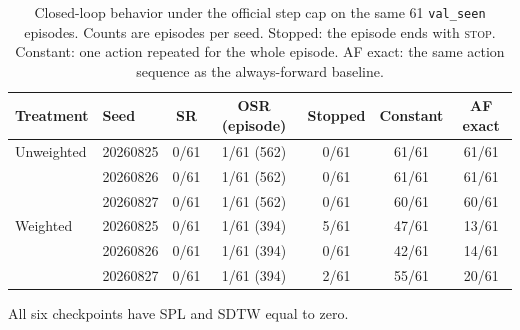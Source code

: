\begin{table}[t]
\centering
\small
\caption{Closed-loop behavior under the official step cap on the same 61 \texttt{val\_seen} episodes. Counts are episodes per seed. Stopped: the episode ends with \textsc{stop}. Constant: one action repeated for the whole episode. AF exact: the same action sequence as the always-forward baseline.}
\label{tab:closed-loop-behavior}
\begin{tabular}{llccccc}
\toprule
Treatment & Seed & SR & OSR (episode) & Stopped & Constant & AF exact \\
\midrule
Unweighted & 20260825 & 0/61 & 1/61 (562) & 0/61 & 61/61 & 61/61 \\
 & 20260826 & 0/61 & 1/61 (562) & 0/61 & 61/61 & 61/61 \\
 & 20260827 & 0/61 & 1/61 (562) & 0/61 & 60/61 & 60/61 \\
\midrule
Weighted & 20260825 & 0/61 & 1/61 (394) & 5/61 & 47/61 & 13/61 \\
 & 20260826 & 0/61 & 1/61 (394) & 0/61 & 42/61 & 14/61 \\
 & 20260827 & 0/61 & 1/61 (394) & 2/61 & 55/61 & 20/61 \\
\bottomrule
\end{tabular}
\par\vspace{4pt}
\parbox[t]{0.98\linewidth}{\footnotesize All six checkpoints have SPL and SDTW equal to zero.}
\end{table}
